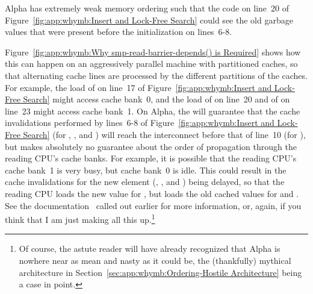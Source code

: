 Alpha has extremely weak memory ordering
such that the code on line~20 of
Figure~\ref{fig:app:whymb:Insert and Lock-Free Search} could see the old
garbage values that were present before the initialization on lines~6-8.

Figure~\ref{fig:app:whymb:Why smp-read-barrier-depends() is Required}
shows how this can happen on
an aggressively parallel machine with partitioned caches, so that
alternating cache lines are processed by the different partitions
of the caches.
For example, the load of  on line~17 of
Figure~\ref{fig:app:whymb:Insert and Lock-Free Search}
might access cache bank~0,
and the load of  on line~20 and of  on line~23
might access cache bank~1.
On Alpha, the  will guarantee that the cache invalidations
performed by lines~6-8 of
Figure~\ref{fig:app:whymb:Insert and Lock-Free Search}
(for , , and ) will reach
the interconnect before that of line~10 (for ), but
makes absolutely no guarantee about the order of
propagation through the reading CPU's cache banks.
For example, it is possible that the reading CPU's cache bank~1 is very
busy, but cache bank~0 is idle.
This could result in the cache invalidations for the new element
(, , and ) being
delayed, so that the reading CPU loads the new value for ,
but loads the old cached values for  and .
See the documentation~\cite{Compaq01} called out earlier for more information,
or, again, if you think that I am just making all this up.\footnote{
	Of course, the astute reader will have already recognized that
	Alpha is nowhere near as mean and nasty as it could be,
	the (thankfully) mythical architecture in
	Section~\ref{sec:app:whymb:Ordering-Hostile Architecture}
	being a case in point.}

